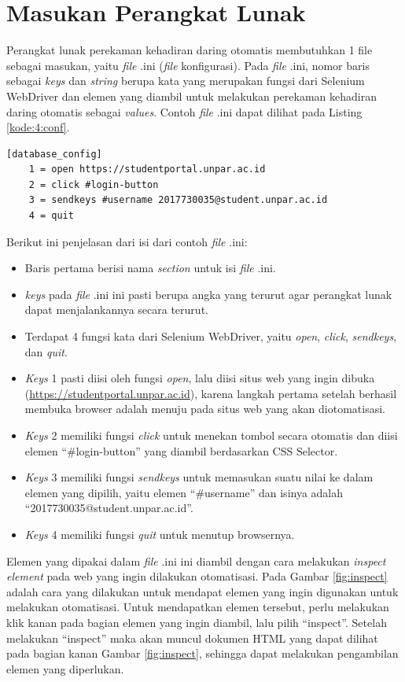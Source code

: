 \section{Masukan Perangkat Lunak}
\label{sec:inputConfig} 
Perangkat lunak perekaman kehadiran daring otomatis membutuhkan 1 file sebagai masukan, yaitu \textit{file} .ini (\textit{file} konfigurasi). Pada \textit{file} .ini, nomor baris sebagai \textit{keys} dan \textit{string} berupa kata yang merupakan fungsi dari Selenium WebDriver dan elemen yang diambil untuk melakukan perekaman kehadiran daring otomatis sebagai \textit{values}. Contoh \textit{file} .ini dapat dilihat pada Listing \ref{kode:4:conf}.
\begin{lstlisting}[caption=Contoh \textit{file} .ini untuk Masukan Perangkat Lunak Perekaman Kehadiran Daring Otomatis, label=kode:4:conf]
	[database_config]
	1 = open https://studentportal.unpar.ac.id
	2 = click #login-button
	3 = sendkeys #username 2017730035@student.unpar.ac.id 
	4 = quit
\end{lstlisting}
Berikut ini penjelasan dari isi dari contoh \textit{file} .ini:
\begin{itemize}
	\item Baris pertama berisi nama \textit{section} untuk isi \textit{file} .ini.
	\item \textit{keys} pada \textit{file} .ini ini pasti berupa angka yang terurut agar perangkat lunak dapat menjalankannya secara terurut.
	\item Terdapat 4 fungsi kata dari Selenium WebDriver, yaitu \textit{open}, \textit{click}, \textit{sendkeys}, dan \textit{quit}.
	\item \textit{Keys} 1 pasti diisi oleh fungsi \textit{open}, lalu diisi situs web yang ingin dibuka (\url{https://studentportal.unpar.ac.id}), karena langkah pertama setelah berhasil membuka browser adalah menuju pada situs web yang akan diotomatisasi.
	\item \textit{Keys} 2 memiliki fungsi \textit{click} untuk menekan tombol secara otomatis dan diisi elemen ``\#login-button'' yang diambil berdasarkan CSS Selector.
	\item \textit{Keys} 3 memiliki fungsi \textit{sendkeys} untuk memasukan suatu nilai ke dalam elemen yang dipilih, yaitu elemen ``\#username'' dan isinya adalah ``2017730035@student.unpar.ac.id''.
	\item \textit{Keys} 4 memiliki fungsi \textit{quit} untuk menutup browsernya.
\end{itemize}
Elemen yang dipakai dalam \textit{file} .ini ini diambil dengan cara melakukan \textit{inspect element} pada web yang ingin dilakukan otomatisasi. Pada Gambar \ref{fig:inspect} adalah cara yang dilakukan untuk mendapat elemen yang ingin digunakan untuk melakukan otomatisasi. Untuk mendapatkan elemen tersebut, perlu melakukan klik kanan pada bagian elemen yang ingin diambil, lalu pilih ``inspect''. Setelah melakukan ``inspect'' maka akan muncul dokumen HTML yang dapat dilihat pada bagian kanan Gambar \ref{fig:inspect}, sehingga dapat melakukan pengambilan elemen yang diperlukan.
